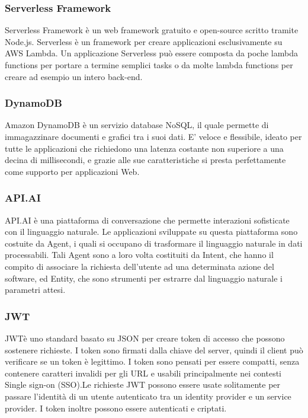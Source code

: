 \subsubsection{Serverless Framework}
Serverless Framework è un web framework gratuito e open-source scritto tramite Node.js. Serverless è un framework per creare applicazioni esclusivamente su AWS Lambda. Un applicazione Serverless può essere composta da poche lambda functions per portare a termine semplici tasks o da molte lambda functions per creare ad esempio un intero back-end.

\subsubsection{DynamoDB}
Amazon DynamoDB è un servizio database NoSQL, il quale permette di immagazzinare documenti e grafici tra i suoi dati. E' veloce e flessibile, ideato per tutte le applicazioni che richiedono una latenza costante non superiore a una decina di millisecondi, e grazie alle sue caratteristiche si presta perfettamente come supporto per applicazioni Web.

\subsubsection{API.AI}
API.AI è una piattaforma di conversazione che permette interazioni sofisticate con il linguaggio naturale.
Le applicazioni sviluppate su questa piattaforma sono costuite da Agent, i quali si occupano di trasformare il linguaggio naturale in dati processabili. Tali Agent sono a loro volta costituiti da Intent, che hanno il compito di associare la richiesta dell'utente ad una determinata azione del software, ed Entity, che sono strumenti per estrarre dal linguaggio naturale i parametri attesi.

\subsubsection{JWT}
JWTè uno standard basato su JSON per creare token di accesso che possono sostenere richieste. I token sono firmati dalla chiave del server, quindi il client può verificare se un token è legittimo. I token sono pensati per essere compatti, senza contenere caratteri invalidi per gli URL e usabili principalmente nei contesti Single sign-on (SSO).Le richieste JWT possono essere usate solitamente per passare l'identità di un utente autenticato tra un identity provider e un service provider. I token inoltre possono essere autenticati e criptati.

